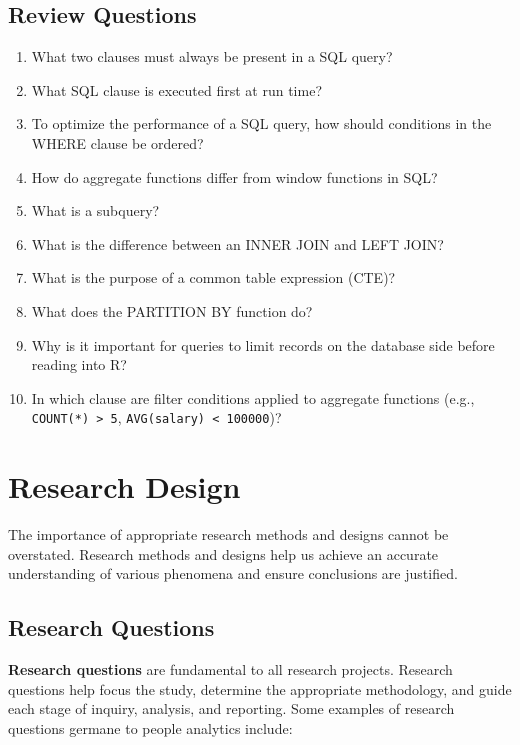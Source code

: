 \documentclass[
]{book}
\begin{document}
\hypertarget{review-questions-1}{%
\section{Review Questions}\label{review-questions-1}}

\begin{enumerate}
\def\labelenumi{\arabic{enumi}.}
\item
  What two clauses must always be present in a SQL query?
\item
  What SQL clause is executed first at run time?
\item
  To optimize the performance of a SQL query, how should conditions in the WHERE clause be ordered?
\item
  How do aggregate functions differ from window functions in SQL?
\item
  What is a subquery?
\item
  What is the difference between an INNER JOIN and LEFT JOIN?
\item
  What is the purpose of a common table expression (CTE)?
\item
  What does the PARTITION BY function do?
\item
  Why is it important for queries to limit records on the database side before reading into R?
\item
  In which clause are filter conditions applied to aggregate functions (e.g., \texttt{COUNT(*)\ \textgreater{}\ 5}, \texttt{AVG(salary)\ \textless{}\ 100000})?
\end{enumerate}

\hypertarget{research}{%
\chapter{Research Design}\label{research}}

The importance of appropriate research methods and designs cannot be overstated. Research methods and designs help us achieve an accurate understanding of various phenomena and ensure conclusions are justified.

\hypertarget{research-questions}{%
\section{Research Questions}\label{research-questions}}

\textbf{Research questions} are fundamental to all research projects. Research questions help focus the study, determine the appropriate methodology, and guide each stage of inquiry, analysis, and reporting. Some examples of research questions germane to people analytics include:
\end{document}
